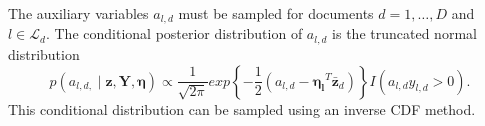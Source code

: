 The auxiliary variables $a_{l,d}$ must be sampled for documents $d=1,\ldots,D$
and $l\in\mathcal{L}_{d}$. The conditional posterior distribution
of $a_{l,d}$ is the truncated normal distribution \begin{equation}
p\left(a_{l,d,}\mid\mathbf{z},\mathbf{Y},\mathbf{\eta}\right)\propto\frac{1}{\sqrt{2\pi}}exp\left\{ -\frac{1}{2}\left(a_{l,d}-\mathbf{\eta_{l}}^{T}\mathbf{\bar{z}}_{d}\right)\right\} I\left(a_{l,d}y_{l,d}>0\right).\end{equation}
 This conditional distribution can be sampled using an inverse CDF
method. %
